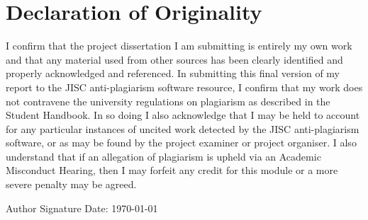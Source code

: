 \chapter*{Declaration of Originality}
I confirm that the project dissertation I am submitting is entirely my own work and that any material used from other sources has been clearly identified and properly acknowledged and referenced. In submitting this final version of my report to the JISC anti-plagiarism software resource, I confirm that my work does not contravene the university regulations on plagiarism as described in the Student Handbook. In so doing I also acknowledge that I may be held to account for any particular instances of uncited work detected by the JISC anti-plagiarism software, or as may be found by the project examiner or project organiser. I also understand that if an allegation of plagiarism is upheld via an Academic Misconduct Hearing, then I may forfeit any credit for this module or a more severe penalty may be agreed.

\thesistitle

\thesisauthor

Author Signature \hfill Date: \today

\thesissupervisor
